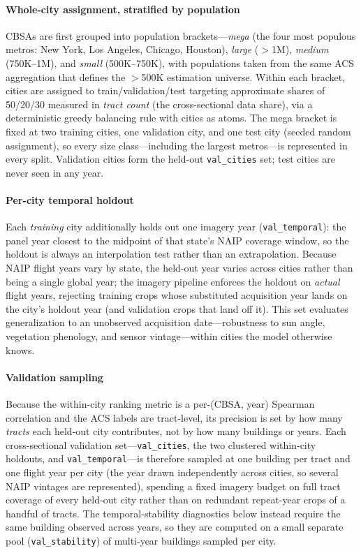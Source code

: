 \documentclass[conference]{IEEEtran}
\begin{document}
\paragraph{Whole-city assignment, stratified by population}
CBSAs are first grouped into population brackets---\emph{mega} (the four most populous metros: New York, Los Angeles, Chicago, Houston), \emph{large} ($>$1M), \emph{medium} (750K--1M), and \emph{small} (500K--750K), with populations taken from the same ACS aggregation that defines the $>$500K estimation universe. Within each bracket, cities are assigned to train/validation/test targeting approximate shares of 50/20/30 measured in \emph{tract count} (the cross-sectional data share), via a deterministic greedy balancing rule with cities as atoms. The mega bracket is fixed at two training cities, one validation city, and one test city (seeded random assignment), so every size class---including the largest metros---is represented in every split. Validation cities form the held-out \texttt{val\_cities} set; test cities are never seen in any year.

\paragraph{Per-city temporal holdout}
Each \emph{training} city additionally holds out one imagery year (\texttt{val\_temporal}): the panel year closest to the midpoint of that state's NAIP coverage window, so the holdout is always an interpolation test rather than an extrapolation. Because NAIP flight years vary by state, the held-out year varies across cities rather than being a single global year; the imagery pipeline enforces the holdout on \emph{actual} flight years, rejecting training crops whose substituted acquisition year lands on the city's holdout year (and validation crops that land off it). This set evaluates generalization to an unobserved acquisition date---robustness to sun angle, vegetation phenology, and sensor vintage---within cities the model otherwise knows.

\paragraph{Validation sampling}
Because the within-city ranking metric is a per-(CBSA, year) Spearman correlation and the ACS labels are tract-level, its precision is set by how many \emph{tracts} each held-out city contributes, not by how many buildings or years. Each cross-sectional validation set---\texttt{val\_cities}, the two clustered within-city holdouts, and \texttt{val\_temporal}---is therefore sampled at one building per tract and one flight year per city (the year drawn independently across cities, so several NAIP vintages are represented), spending a fixed imagery budget on full tract coverage of every held-out city rather than on redundant repeat-year crops of a handful of tracts. The temporal-stability diagnostics below instead require the same building observed across years, so they are computed on a small separate pool (\texttt{val\_stability}) of multi-year buildings sampled per city.
\end{document}
